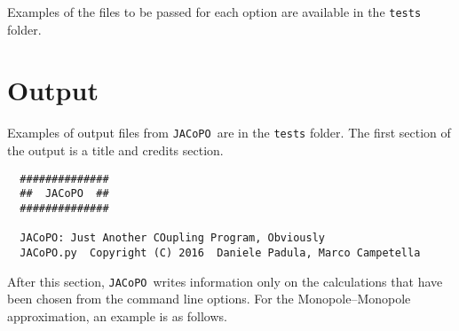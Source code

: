 \documentclass[a4paper]{article}
\newcommand{\jacopo}{\texttt{JACoPO}}
\begin{document}
Examples of the files to be passed for each option are available in the \verb|tests| folder.

\section{Output}
Examples of output files from \jacopo\ are in the \verb|tests| folder. The first section of the output is a title and credits section.

\begin{verbatim}
  ##############
  ##  JACoPO  ##
  ##############
  
  JACoPO: Just Another COupling Program, Obviously
  JACoPO.py  Copyright (C) 2016  Daniele Padula, Marco Campetella
\end{verbatim}

After this section, \jacopo\ writes information only on the calculations that have been chosen from the command line options.
For the Monopole--Monopole approximation, an example is as follows.
\end{document}
